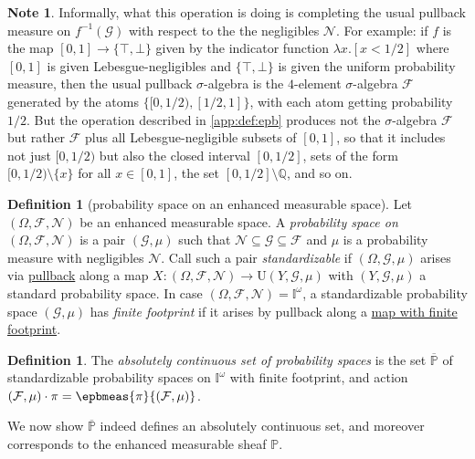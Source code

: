 \documentclass[
  sigconf,
  screen, ]{acmart}
\theoremstyle{definition}
\newtheorem{definition}[theorem]{Definition}
\newtheorem{note}[theorem]{Note}
\newcommand\calF{\mathcal F}
\newcommand\calG{\mathcal G}
\newcommand\calN{\mathcal N}
\newcommand\Q{\mathbb Q}
\newcommand\nref[2]{\hyperref[#1]{#2}} \newcommand\checkhigh{{\huge{\color{red}\textbf{TODO: check}}}}
\newcommand\vtrue{\top}
\newcommand\vfalse{\bot}
\newcommand\texforgetmu{\mathrm{U}}
\newcommand\forgetmu{{\nref{def:forgetmu}{\texforgetmu}}}
\newcommand\texhcube{{{{\mathbb I}^\omega}}}
\newcommand\hcube{{\nref{def:hcube}{\texhcube}}}
\newcommand\texagoodname{absolutely continuous set}
\newcommand\agoodname{\texagoodname}
\newcommand\aagoodname{an \texagoodname}
\newcommand\sheafcatadj{enhanced measurable}
\newcommand\texgoodsheaf{\sheafcatadj{} sheaf}
\newcommand\goodsheaf{\texgoodsheaf}
\newcommand\texpspcs{\mathbb P}
\newcommand\pspcs{{\nref{def:mble-pspcs}{\texpspcs}}}
\newcommand\texgpspcs{\overline{\mathbb P}}
\newcommand\gpspcs{{\nref{def:gpspcs}{\texgpspcs}}}
\begin{document}
\begin{note}
  Informally, what this operation is doing
  is completing the usual pullback measure on $f^{-1}(\calG)$
  with respect to the the negligibles $\calN$.
  For example: if $f$ is the map $[0,1]\to \{\vtrue,\vfalse\}$
  given by the indicator function $\lambda x. [x<1/2]$
  where $[0,1]$ is given Lebesgue-negligibles
  and $\{\vtrue,\vfalse\}$ is given the uniform probability measure,
  then the usual pullback $\sigma$-algebra is
  the $4$-element $\sigma$-algebra $\calF$
  generated by the atoms $\{[0,1/2), [1/2, 1]\}$,
  with each atom getting probability $1/2$.
  But the operation described in \cref{app:def:epb}
  produces not the $\sigma$-algebra $\calF$
  but rather $\calF$ plus all Lebesgue-negligible subsets of $[0,1]$,
  so that it includes not just $[0,1/2)$
  but also the closed interval $[0,1/2]$,
  sets of the form $[0,1/2)\setminus \{x\}$ for all $x\in[0,1]$,
  the set $[0,1/2] \setminus \Q$, and so on.
\end{note}

\begin{definition}[probability space on an enhanced measurable space] \label{app:def:pspc-on-ems}
  Let $(\Omega,\calF,\calN)$ be an enhanced measurable space.
  A \emph{probability space on} $(\Omega,\calF,\calN)$
  is a pair $(\calG,\mu)$
  such that $\calN\subseteq \calG\subseteq\calF$
  and $\mu$ is a probability measure with negligibles $\calN$.
  Call such a pair \emph{standardizable} if $(\Omega,\calG,\mu)$
  arises via \nref{app:def:epb}{pullback}
  along a map $X : (\Omega,\calF,\calN)\to \forgetmu(Y,\calG,\mu)$
  with $(Y,\calG,\mu)$ a standard probability space.
  In case $(\Omega,\calF,\calN) = \hcube$,
  a standardizable probability space $(\calG,\mu)$
  has \emph{finite footprint}
  if it arises by pullback along a \nref{app:def:mblespcramap}{map with finite footprint}.
\end{definition}

\begin{definition} \label{app:def:pspcs-pnom}
  The \emph{\agoodname{} of probability spaces}
  is the set $\gpspcs$
  of standardizable probability spaces on $\hcube$ with finite footprint,
  and action $(\calF,\mu)\cdot\pi = \epbmeas{\pi}{(\calF,\mu)}$.
\end{definition}

We now show $\gpspcs$ indeed defines \aagoodname{}, and moreover corresponds to the
\goodsheaf{} $\pspcs$.
\end{document}
